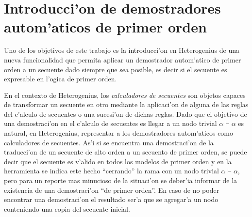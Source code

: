 \section{Introducci'on de demostradores autom'aticos de primer orden}

Uno de los objetivos de este trabajo es la introducci'on en Heterogenius de una nueva funcionalidad que permita aplicar un demostrador autom'atico de primer orden a un secuente dado siempre que sea posible, es decir si el secuente es expresable en l'ogica de primer orden.

En el contexto de Heterogenius, los \textit{calculadores de secuentes} son objetos capaces de transformar un secuente en otro mediante la aplicaci'on de alguna de las reglas del c'alculo de secuentes o una sucesi'on de dichas reglas.
Dado que el objetivo de una demostraci'on en el c'alculo de secuentes es llegar a un nodo trivial $\alpha \vdash \alpha$ es natural, en Heterogenius, representar a los demostradores autom'aticos como calculadores de secuentes. As'i si se encuentra una demostraci'on de la traducci'on de un secuente de alto orden a un secuento de primer orden, se puede decir que el secuente es v'alido en todos los modelos de primer orden y en la herramienta se indica este hecho ``cerrando'' la rama con un nodo trivial $\alpha \vdash \alpha$, pero para un reporte mas minucioso de la situaci'on se deber'ia informar de la existencia de una demostraci'on ``de primer orden''. En caso de no poder encontrar una demostraci'on el resultado ser'a que se agregar'a un nodo conteniendo una copia del secuente inicial.